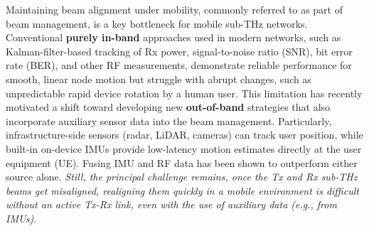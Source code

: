 \documentclass[fleqn,10pt]{wlscirep}
\begin{document}
Maintaining beam alignment under mobility, commonly referred to as part of beam management, is a key bottleneck for mobile sub-THz networks\cite{Giordani2018ATO, 10422712, Wang2022}. Conventional \textbf{purely in-band} approaches used in modern networks, such as Kalman-filter-based tracking of Rx power, signal-to-noise ratio (SNR), bit error rate (BER), and other RF measurements\cite{8455289,9145366,10067030, 10123123}, demonstrate reliable performance for smooth, linear node motion but struggle with abrupt changes, such as unpredictable rapid device rotation by a human user\cite{Wang2022}. This limitation has recently motivated a shift toward developing new \textbf{out-of-band} strategies that also incorporate auxiliary sensor data into the beam management\cite{10494372, Azari2022, Nokia2022, Chen2023, Jornet2023}. Particularly, infrastructure-side sensors (radar, LiDAR, cameras) can track user position\cite{10422712,5GPPP_Automotive_Vision_2015}, while built-in on-device IMUs provide low-latency motion estimates directly at the user equipment (UE). Fusing IMU and RF data has been shown to outperform either source alone\cite{10036372,9391649,electronics8020142, s21082723, 9814507}. \emph{Still, the principal challenge remains, once the Tx and Rx sub-THz beams get misaligned, realigning them quickly in a mobile environment is difficult without an active Tx-Rx link, even with the use of auxiliary data (e.g., from IMUs).}
\end{document}
